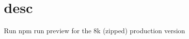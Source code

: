 \chapter{desc}
\hypertarget{md__d_1_2_g_i_t_2_food_link_2foodlink_8client_2node__modules_2bs-recipes_2recipes_2webpack_8typescript_8react_2desc}{}\label{md__d_1_2_g_i_t_2_food_link_2foodlink_8client_2node__modules_2bs-recipes_2recipes_2webpack_8typescript_8react_2desc}
Run {\ttfamily npm run preview} for the 8k (zipped) production version 